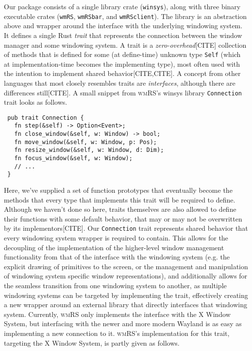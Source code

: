
Our  package  consists  of  a  single  library  crate  (\texttt{winsys}),  along
with  three  binary  executable  crates  (\texttt{wmRS},  \texttt{wmRSbar},  and
\texttt{wmRSclient}). The library is an abstraction above and wrapper around the
interface  with  the underlying  windowing  system.  It  defines a  single  Rust
\textit{trait} that  represents the  connection between  the window  manager and
some windowing system.  A trait is a  \textit{zero-overhead}[CITE] collection of
methods that  is defined  for some (at  define-time) unknown  type \texttt{Self}
(which at  implementation-time becomes the  implementing type), most  often used
with the intention to implement shared behavior[CITE,CITE]. A concept from other
languages that  most closely resembles traits  are \textit{interfaces}, although
there are differences  still[CITE]. A small snippet  from \textsc{wmRS}'s winsys
library \texttt{Connection} trait looks as follows.\\

\begin{verbatim}
 pub trait Connection {
   fn step(&self) -> Option<Event>;
   fn close_window(&self, w: Window) -> bool;
   fn move_window(&self, w: Window, p: Pos);
   fn resize_window(&self, w: Window, d: Dim);
   fn focus_window(&self, w: Window);
   // ...
 }
\end{verbatim}

Here, we've  supplied a set  of function  prototypes that eventually  become the
methods that every  type that implements this trait will  be required to define.
Although we haven't  done so here, traits themselves are  also allowed to define
their functions with  some default behavior, that may or  may not be overwritten
by  its  implementors[CITE].  Our \texttt{Connection}  trait  represents  shared
behavior that every windowing system wrapper is required to contain. This allows
for the decoupling  of the implementation of the  higher-level window management
functionality from  that of the  interface with  the windowing system  (e.g. the
explicit drawing of primitives to the screen, or the management and manipulation
of windowing  system specific  window representations), and  additionally allows
for the  seamless transition from one  windowing system to another,  as multiple
windowing  systems  can  be  targeted by  implementing  the  trait,  effectively
creating a new wrapper around an  external library that directly interfaces that
windowing system.  Currently, \textsc{wmRS}  only implements the  interface with
the X Window System,  but interfacing with the newer and  more modern Wayland is
as easy as  implementing a new connection to  it. \textsc{wmRS}'s implementation
for this trait, targeting the X Window System, is partly given as follows.


